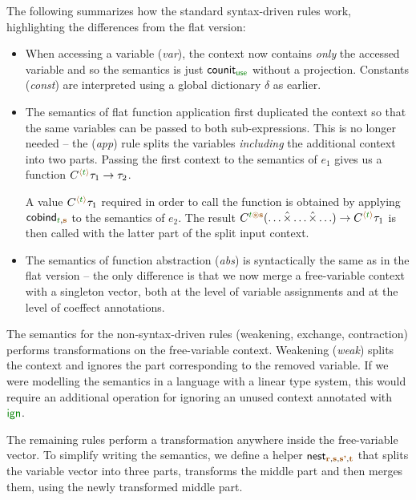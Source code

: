 The following summarizes how the standard syntax-driven rules work, highlighting the differences
from the flat version:

\begin{itemize}
\item When accessing a variable (\emph{var}), the context now contains \emph{only} the accessed
  variable and so the semantics is just $\ident{counit}_{\cunit}$ without a projection.
  Constants (\emph{const}) are interpreted using a global dictionary $\delta$ as earlier.

\item The semantics of flat function application first duplicated the context so that the same 
  variables can be passed to both sub-expressions. This is no longer needed -- the 
  (\emph{app}) rule splits the variables \emph{including} the additional context into two parts.
  Passing the first context to the semantics of $e_1$ gives us a function
  $\ctyp{\alift{\cclrd{t}}}{\tau_1} \rightarrow \tau_2$. 

  A value $\ctyp{\alift{\cclrd{t}}}{\tau_1}$ required in order to call the function is obtained by 
  applying $\ident{cobind}_{\cclrd{t}, \aclrd{\textbf{s}}}$ to the semantics of $e_2$. The result 
  $\ctyp{\cclrd{t}\aseq\aclrd{\textbf{s}}}{(\ldots \xtimes \ldots \xtimes \ldots)} \rightarrow \ctyp{\alift{\cclrd{t}}}{\tau_1}$
  is then called with the latter part of the split input context.

\item The semantics of function abstraction (\emph{abs}) is syntactically the same as in the 
  flat version -- the only difference is that we now merge a free-variable context with a 
  singleton vector, both at the level of variable assignments and at the level of coeffect 
  annotations.
\end{itemize}

\noindent
The semantics for the non-syntax-driven rules (weakening, exchange, contraction) performs 
transformations on the free-variable context. Weakening (\emph{weak}) splits the context and 
ignores the part corresponding to the removed variable. If we were modelling the semantics in 
a language with a linear type system, this would require an additional operation for ignoring an
unused context annotated with $\aclrd{\czero}$.

The remaining rules perform a transformation anywhere inside the free-variable vector. 
To simplify writing the semantics, we define a helper 
$\ident{nest}_{\aclrd{\textbf{r}}, \aclrd{\textbf{s}}, \aclrd{\textbf{s'}}, \aclrd{\textbf{t}}}$
that splits the variable vector into three parts, transforms the middle part and then 
merges them, using the newly transformed middle part.

